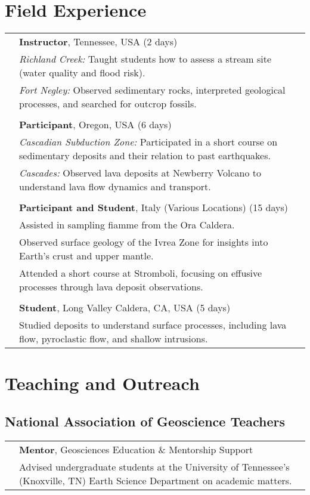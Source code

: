 \documentclass[a4paper,10pt]{article}
\newcommand{\subheading}[1]{\vspace{0.5cm}\noindent\makebox[\textwidth][l]{\underline{\textbf{#1}}}\par\vspace{0.3cm}}
\begin{document}
\section*{Field Experience}

    \begin{tabularx}{\textwidth}{>{\raggedright\arraybackslash}p{1cm} X}
        2024 & \textbf{Instructor}, Tennessee, USA (2 days) \\
             & \textit{Richland Creek:} Taught students how to assess a stream site (water quality and flood risk). \\
             & \textit{Fort Negley:} Observed sedimentary rocks, interpreted geological processes, and searched for outcrop fossils. \\\\
        
        2023 & \textbf{Participant}, Oregon, USA (6 days) \\
             & \textit{Cascadian Subduction Zone:} Participated in a short course on sedimentary deposits and their relation to past earthquakes. \\
             & \textit{Cascades:} Observed lava deposits at Newberry Volcano to understand lava flow dynamics and transport. \\\\
        
        2022 & \textbf{Participant and Student}, Italy (Various Locations) (15 days) \\
             & Assisted in sampling fiamme from the Ora Caldera. \\
             & Observed surface geology of the Ivrea Zone for insights into Earth's crust and upper mantle. \\
             & Attended a short course at Stromboli, focusing on effusive processes through lava deposit observations. \\\\
        
        2022 & \textbf{Student}, Long Valley Caldera, CA, USA (5 days) \\
             & Studied deposits to understand surface processes, including lava flow, pyroclastic flow, and shallow intrusions.
    \end{tabularx}

\section*{Teaching and Outreach}
\subsection*{National Association of Geoscience Teachers}
\begin{tabularx}{\textwidth}{>{\raggedright\arraybackslash}p{2.5cm} X}
2024 & \textbf{Mentor}, Geosciences Education \& Mentorship Support \\
     & Advised undergraduate students at the University of Tennessee's (Knoxville, TN) Earth Science Department on academic matters.
\end{tabularx}
\end{document}
